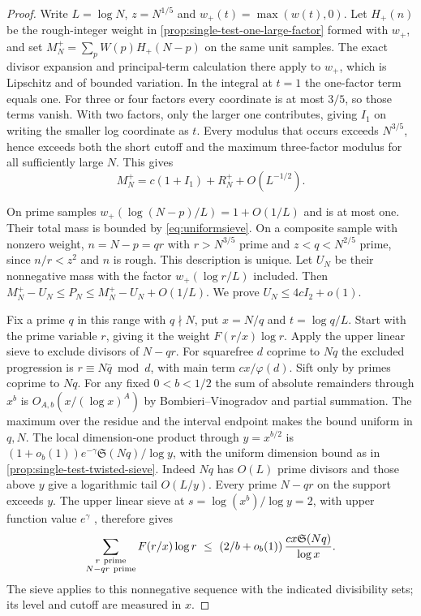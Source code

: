 \documentclass[11pt,a4paper]{article}
\numberwithin{equation}{section}
\newcommand{\SSS}{\mathfrak S}
\begin{document}
\begin{proof}
Write $L=\log N$, $z=N^{1/5}$ and $w_+(t)=\max(w(t),0)$.
Let $H_+(n)$ be the rough-integer weight in
\cref{prop:single-test-one-large-factor} formed with $w_+$,
and set $M_N^+=\sum_p W(p)H_+(N-p)$ on the same unit samples.
The exact divisor expansion and principal-term calculation there
apply to $w_+$, which is Lipschitz and of bounded variation.
In the integral at $t=1$ the one-factor term equals one. For
three or four factors every coordinate is at most $3/5$, so those
terms vanish. With two factors, only the larger one contributes,
giving $I_1$ on writing the smaller log coordinate as $t$.
Every modulus that occurs exceeds $N^{3/5}$, hence exceeds both
the short cutoff and the maximum three-factor modulus for all
sufficiently large $N$. This gives
\[
 M_N^+=c(1+I_1)+R_N^++O(L^{-1/2}).
\]

On prime samples $w_+(\log(N-p)/L)=1+O(1/L)$ and is at most
one. Their total mass is bounded by \eqref{eq:uniformsieve}.
On a composite sample with nonzero weight, $n=N-p=qr$ with
$r>N^{3/5}$ prime and $z<q<N^{2/5}$ prime, since $n/r<z^2$
and $n$ is rough. This description is unique. Let $U_N$ be
their nonnegative mass with the factor $w_+(\log r/L)$ included.
Then $M_N^+-U_N\le P_N\le M_N^+-U_N+O(1/L)$. We prove
$U_N\le4cI_2+o(1)$.

Fix a prime $q$ in this range with $q\nmid N$, put $x=N/q$
and $t=\log q/L$. Start with the prime variable $r$, giving
it the weight $F(r/x)\log r$. Apply the upper linear sieve to
exclude divisors of $N-qr$. For squarefree $d$ coprime to $Nq$
the excluded progression is $r\equiv N\bar q\bmod d$, with
main term $cx/\varphi(d)$. Sift only by primes coprime to $Nq$.
For any fixed $0<b<1/2$ the sum of absolute remainders through
$x^b$ is $O_{A,b}(x/(\log x)^A)$ by Bombieri--Vinogradov
and partial summation. The maximum over the residue and the
interval endpoint makes the bound uniform in $q,N$. The local
dimension-one product through $y=x^{b/2}$ is
$(1+o_b(1))e^{-\gamma}\SSS(Nq)/\log y$, with the uniform
dimension bound as in \cref{prop:single-test-twisted-sieve}.
Indeed $Nq$ has $O(L)$ prime divisors and those above $y$
give a logarithmic tail $O(L/y)$.
Every prime $N-qr$ on the support exceeds $y$. The upper linear
sieve at $s=\log(x^b)/\log y=2$, with upper function value
$e^\gamma$ \cite[Lemma~2.5 and (2.4)]{MatomakiZunigaSwitching},
therefore gives
\[
 \sum_{\substack{r\ {\rm prime}\\ N-qr\ {\rm prime}}}
 F(r/x)\log r
 \ \le\ (2/b+o_b(1))\,\frac{cx\SSS(Nq)}{\log x}.
\]
The sieve applies to this nonnegative sequence with the indicated
divisibility sets; its level and cutoff are measured in $x$.


\end{proof}
\end{document}

